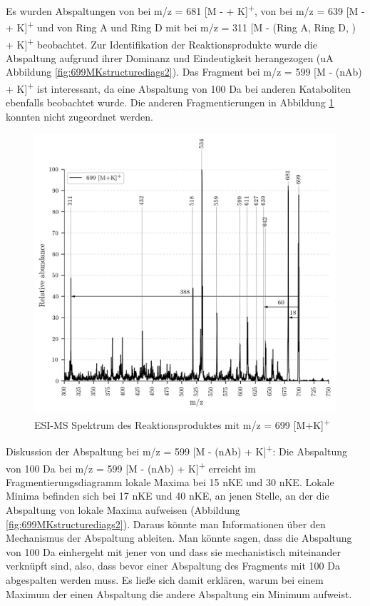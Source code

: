 Es wurden Abspaltungen von  bei m/z = 681 [M -  + K]\textsuperscript{+}, von  bei m/z = 639 [M -  + K]\textsuperscript{+} und von Ring A und Ring D mit  bei m/z = 311 [M - (Ring A, Ring D, ) + K]\textsuperscript{+} beobachtet. Zur Identifikation der Reaktionsprodukte wurde die  Abspaltung aufgrund ihrer Dominanz und Eindeutigkeit herangezogen (\gls{uA} Abbildung \ref{fig:699MKstructurediags2}). Das Fragment bei m/z = 599 [M - (\gls{nAb}) + K]\textsuperscript{+} ist interessant, da eine Abspaltung von 100 Da bei anderen Kataboliten ebenfalls beobachtet wurde. Die anderen Fragmentierungen in Abbildung \ref{fig:699MKLeafspray} konnten nicht zugeordnet werden. \\

\begin{figure}[!htbp]
  \centering
  \includegraphics[width=\textwidth, height=0.6\textwidth]{figures/Kapitel4/Kataboliten/VWA_MS_LeafSpray_699.png}
  \caption[ESI-MS Spektrum des Reaktionsproduktes von Bo-DNCC, Quelle: Autor]{ESI-MS Spektrum des Reaktionsproduktes mit m/z = 699 [M+K]\textsuperscript{+}}
  \label{fig:699MKLeafspray}
\end{figure}

Diskussion der Abspaltung bei m/z = 599 [M - (\gls{nAb}) + K]\textsuperscript{+}: Die Abspaltung von 100 Da bei m/z = 599 [M - (\gls{nAb}) + K]\textsuperscript{+} erreicht im Fragmentierungsdiagramm lokale Maxima bei 15 \gls{nKE} und 30 \gls{nKE}. Lokale Minima befinden sich bei 17 \gls{nKE} und 40 \gls{nKE}, an jenen Stelle, an der die Abspaltung von  lokale Maxima aufweisen (Abbildung \ref{fig:699MKstructurediags2}). Daraus könnte man Informationen über den Mechanismus der Abspaltung ableiten. Man könnte sagen, dass die Abspaltung von 100 Da einhergeht mit jener von  und dass sie mechanistisch miteinander verknüpft sind, also, dass bevor einer Abspaltung des Fragments mit 100 Da  abgespalten werden muss. Es ließe sich damit erklären, warum bei einem Maximum der einen Abspaltung die andere Abspaltung ein Minimum aufweist.\\ 

